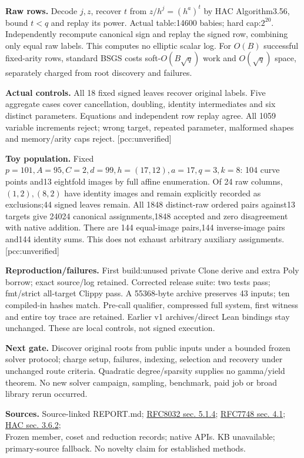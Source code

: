 \documentclass[10pt]{article}
\begin{document}
\textbf{Raw rows.} Decode $j,z$, recover $t$ from
$z/h^j=(h^a)^t$ by HAC Algorithm3.56, bound $t<q$ and replay its power.
Actual table:14600 babies; hard cap:$2^{20}$. Independently recompute
canonical sign and replay the signed row, combining only equal raw labels.
This computes no elliptic scalar log. For $O(B)$ successful fixed-arity
rows, standard BSGS costs soft-$O(B\sqrt q)$ work and $O(\sqrt q)$ space,
separately charged from root discovery and failures.

\textbf{Actual controls.} All 18 fixed signed leaves recover original
labels. Five aggregate cases cover cancellation, doubling, identity
intermediates and six distinct parameters. Equations and independent row
replay agree. All 1059 variable increments reject; wrong target, repeated
parameter, malformed shapes and memory/arity caps reject. [pcc:unverified]

\textbf{Toy population.} Fixed $p=101,A=95,C=2,d=99,h=(17,12),a=17,q=3,k=8$:
104 curve points and13 eightfold images by full affine enumeration. Of 24
raw columns, $(1,2),(8,2)$ have identity images and remain explicitly
recorded as exclusions;44 signed leaves remain. All 1848 distinct-raw
ordered pairs against13 targets give 24024 canonical assignments,1848
accepted and zero disagreement with native addition. There are 144
equal-image pairs,144 inverse-image pairs and144 identity sums. This does
not exhaust arbitrary auxiliary assignments. [pcc:unverified]

\textbf{Reproduction/failures.} First build:unused private Clone derive
and extra Poly borrow; exact source/log retained. Corrected release suite:
two tests pass; fmt/strict all-target Clippy pass. A 55368-byte archive
preserves 43 inputs; ten compiled-in hashes match. Pre-call qualifier,
compressed full system, first witness and entire toy trace are retained.
Earlier v1 archives/direct Lean bindings stay unchanged. These are local
controls, not signed execution.

\textbf{Next gate.} Discover original roots from public inputs under a
bounded frozen solver protocol; charge setup, failures, indexing, selection
and recovery under unchanged route criteria. Quadratic degree/sparsity
supplies no gamma/yield theorem. No new solver campaign, sampling,
benchmark, paid job or broad library rerun occurred.

\textbf{Sources.} Source-linked REPORT.md;
\href{https://www.rfc-editor.org/rfc/rfc8032\#section-5.1.4}{RFC8032 sec. 5.1.4};
\href{https://www.rfc-editor.org/rfc/rfc7748\#section-4.1}{RFC7748 sec. 4.1};
\href{https://cacr.uwaterloo.ca/hac/about/chap3.pdf}{HAC sec. 3.6.2};
\\Frozen member, coset and reduction records; native APIs. KB unavailable;
primary-source fallback. No novelty claim for established methods.
\end{document}
